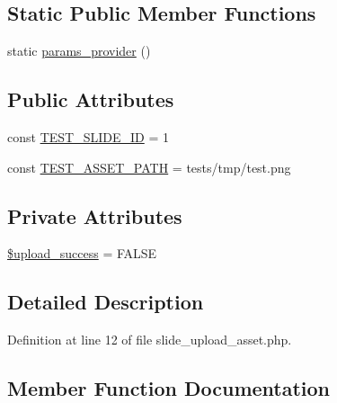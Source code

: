 \subsection*{Static Public Member Functions}
\begin{DoxyCompactItemize}
\item 
static \hyperlink{classlibresignage_1_1tests_1_1api_1_1endpoint_1_1slide_1_1asset_1_1slide__upload__asset_ab55d2b365467ae01731bddf621a0c479}{params\+\_\+provider} ()
\end{DoxyCompactItemize}
\subsection*{Public Attributes}
\begin{DoxyCompactItemize}
\item 
const \hyperlink{classlibresignage_1_1tests_1_1api_1_1endpoint_1_1slide_1_1asset_1_1slide__upload__asset_a426dd2bfbd7fae533dad740a1e0f762c}{T\+E\+S\+T\+\_\+\+S\+L\+I\+D\+E\+\_\+\+ID} = \textquotesingle{}1\textquotesingle{}
\item 
const \hyperlink{classlibresignage_1_1tests_1_1api_1_1endpoint_1_1slide_1_1asset_1_1slide__upload__asset_aaaea870f13bfdc7a3566a0ac1c047884}{T\+E\+S\+T\+\_\+\+A\+S\+S\+E\+T\+\_\+\+P\+A\+TH} = \textquotesingle{}tests/tmp/test.\+png\textquotesingle{}
\end{DoxyCompactItemize}
\subsection*{Private Attributes}
\begin{DoxyCompactItemize}
\item 
\hyperlink{classlibresignage_1_1tests_1_1api_1_1endpoint_1_1slide_1_1asset_1_1slide__upload__asset_aef3fe5d8d7475b958278831dce95ce7e}{\$upload\+\_\+success} = F\+A\+L\+SE
\end{DoxyCompactItemize}


\subsection{Detailed Description}


Definition at line 12 of file slide\+\_\+upload\+\_\+asset.\+php.



\subsection{Member Function Documentation}
\mbox{\label{classlibresignage_1_1tests_1_1api_1_1endpoint_1_1slide_1_1asset_1_1slide__upload__asset_ab55d2b365467ae01731bddf621a0c479}} 
